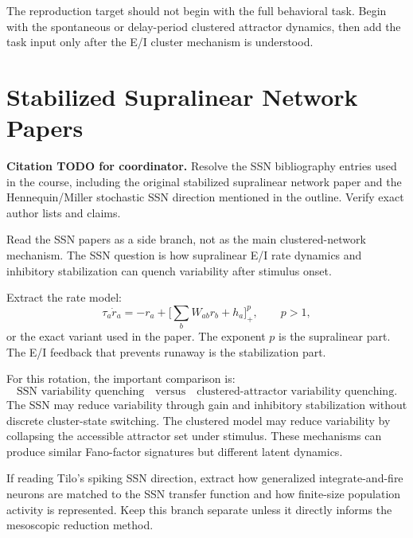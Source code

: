 The reproduction target should not begin with the full behavioral task. Begin with the spontaneous or delay-period clustered attractor dynamics, then add the task input only after the E/I cluster mechanism is understood.

\section{Stabilized Supralinear Network Papers}
\label{app:reading-ssn}

\textbf{Citation TODO for coordinator.} Resolve the SSN bibliography entries used in the course, including the original stabilized supralinear network paper and the Hennequin/Miller stochastic SSN direction mentioned in the outline. Verify exact author lists and claims.

Read the SSN papers as a side branch, not as the main clustered-network mechanism. The SSN question is how supralinear E/I rate dynamics and inhibitory stabilization can quench variability after stimulus onset.

Extract the rate model:
%
\begin{equation}
  \tau_a \dot r_a
  =
  -r_a
  +
  \bigl[
  \sum_b W_{ab}r_b+h_a
  \bigr]_{+}^{p},
  \qquad
  p>1,
  \label{eq:ssn-reading-rate-model}
\end{equation}
%
or the exact variant used in the paper. The exponent $p$ is the supralinear part. The E/I feedback that prevents runaway is the stabilization part.

For this rotation, the important comparison is:
%
\begin{equation}
  \text{SSN variability quenching}
  \quad\text{versus}\quad
  \text{clustered-attractor variability quenching}.
  \label{eq:ssn-clustered-comparison}
\end{equation}
%
The SSN may reduce variability through gain and inhibitory stabilization without discrete cluster-state switching. The clustered model may reduce variability by collapsing the accessible attractor set under stimulus. These mechanisms can produce similar Fano-factor signatures but different latent dynamics.

If reading Tilo's spiking SSN direction, extract how generalized integrate-and-fire neurons are matched to the SSN transfer function and how finite-size population activity is represented. Keep this branch separate unless it directly informs the mesoscopic reduction method.

